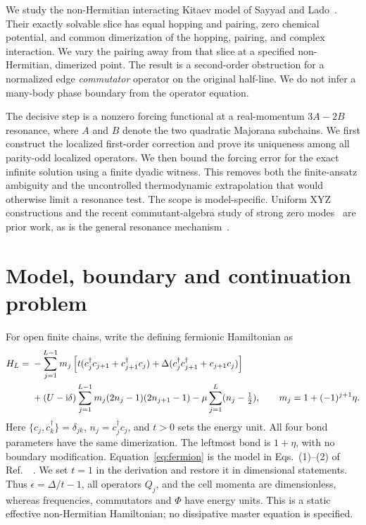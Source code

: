 \documentclass[11pt,a4paper]{article}
\newcommand{\ii}{\mathrm{i}}
\begin{document}
We study the non-Hermitian interacting Kitaev model of Sayyad and
Lado~\cite{Sayyad2023}. Their exactly solvable slice has equal hopping and
pairing, zero chemical potential, and common dimerization of the hopping,
pairing, and complex interaction. We vary the pairing away from that slice
at a specified non-Hermitian, dimerized point. The result is a
second-order obstruction for a normalized edge \emph{commutator} operator on
the original half-line. We do not infer a many-body phase boundary from the
operator equation.

The decisive step is a nonzero forcing functional at a real-momentum
$3A-2B$ resonance, where $A$ and $B$ denote the two quadratic Majorana
subchains. We first construct the localized first-order correction and prove
its uniqueness among all parity-odd localized operators. We then bound the
forcing error for the exact infinite solution using a finite dyadic witness.
This removes both the finite-ansatz ambiguity and the uncontrolled
thermodynamic extrapolation that would otherwise limit a resonance test.
The scope is model-specific. Uniform XYZ constructions and the recent
commutant-algebra study of strong zero modes~\cite{Moudgalya2026} are prior work, as is
the general resonance mechanism~\cite{Olund2025}.

\section{Model, boundary and continuation problem}
For open finite chains, write the defining fermionic Hamiltonian as
\begin{align}
 H_L={}&-\sum_{j=1}^{L-1}m_j\left[t(c_j^\dagger c_{j+1}+c_{j+1}^\dagger c_j)
 +\Delta(c_j^\dagger c_{j+1}^\dagger+c_{j+1}c_j)\right]\notag\\
 &+(U-\ii\delta)\sum_{j=1}^{L-1}m_j(2n_j-1)(2n_{j+1}-1)
 -\mu\sum_{j=1}^L(n_j-\tfrac12),\qquad
 m_j=1+(-1)^{j+1}\eta .\label{eq:fermion}
\end{align}
Here $\{c_j,c_k^\dagger\}=\delta_{jk}$, $n_j=c_j^\dagger c_j$, and
$t>0$ sets the energy unit. All four bond parameters have the same
dimerization. The leftmost bond is $1+\eta$, with no boundary modification.
Equation~\eqref{eq:fermion} is the model in Eqs.~(1)--(2) of
Ref.~~\cite{Sayyad2023}. We set $t=1$ in the derivation and restore it in
dimensional statements. Thus $\epsilon=\Delta/t-1$, all operators $Q_j$,
and the cell momenta are dimensionless, whereas frequencies, commutators and
$\Phi$ have energy units. This is a static effective non-Hermitian
Hamiltonian; no dissipative master equation is specified.
\end{document}
